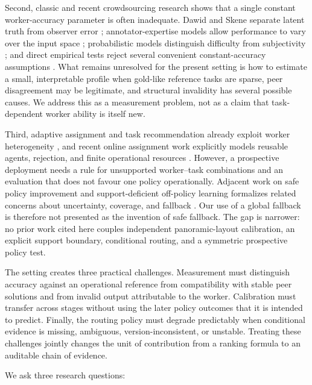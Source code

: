 Second, classic and recent crowdsourcing research shows that a single constant worker-accuracy parameter is often inadequate. Dawid and Skene separate latent truth from observer error \cite{dawid1979observer}; annotator-expertise models allow performance to vary over the input space \cite{yan2010expertise}; probabilistic models distinguish difficulty from subjectivity \cite{jin2018subjectivity}; and direct empirical tests reject several convenient constant-accuracy assumptions \cite{burrell2023conventional}. What remains unresolved for the present setting is how to estimate a small, interpretable profile when gold-like reference tasks are sparse, peer disagreement may be legitimate, and structural invalidity has several possible causes. We address this as a measurement problem, not as a claim that task-dependent worker ability is itself new.

Third, adaptive assignment and task recommendation already exploit worker heterogeneity \cite{ho2013adaptive,kang2018recommendation}, and recent online assignment work explicitly models reusable agents, rejection, and finite operational resources \cite{sumita2022reusable}. However, a prospective deployment needs a rule for unsupported worker--task combinations and an evaluation that does not favour one policy operationally. Adjacent work on safe policy improvement and support-deficient off-policy learning formalizes related concerns about uncertainty, coverage, and fallback \cite{laroche2019spibb,sachdeva2020support}. Our use of a global fallback is therefore not presented as the invention of safe fallback. The gap is narrower: no prior work cited here couples independent panoramic-layout calibration, an explicit support boundary, conditional routing, and a symmetric prospective policy test.

The setting creates three practical challenges. Measurement must distinguish accuracy against an operational reference from compatibility with stable peer solutions and from invalid output attributable to the worker. Calibration must transfer across stages without using the later policy outcomes that it is intended to predict. Finally, the routing policy must degrade predictably when conditional evidence is missing, ambiguous, version-inconsistent, or unstable. Treating these challenges jointly changes the unit of contribution from a ranking formula to an auditable chain of evidence.

We ask three research questions:

